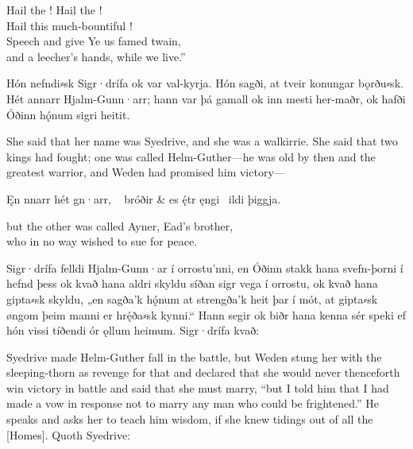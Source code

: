 \bvb Hail the ! Hail the ! \\
\ind Hail this much-bountiful ! \\
Speech and  give Ye us famed twain, \\
\ind and a leecher’s hands, while we live.”\evb\evg


\bpg\bpa[3a] Hón nefndi⸗sk Sigr·drífa ok var val-kyrja. Hón sagði, at tveir konungar bǫrðu⸗sk. Hét annarr Hjalm-Gunn·arr; hann var þá gamall ok inn mesti her-maðr, ok hafði Óðinn hǫ́num sigri heitit.\epa

\bpb She said that her name was Syedrive, and she was a walkirrie.  She said that two kings had fought; one was called Helm-Guther---he was old by then and the greatest warrior, and Weden had promised him victory---\epb\epg

\bvg\bva[4*]%
%
Ęn nnarr hét gn·arr, \hld\  bróðir &
\ind es ę́tr ęngi \hld\ ildi þiggja.\eva

\bvb but the other was called Ayner, Ead’s brother, \\
who in no way wished to sue for peace.\evb\evg

\bpg\bpa[3b] Sigr·drífa felldi Hjalm-Gunn·ar í orrostu’nni, en Óðinn stakk hana svefn-þorni í hefnd þess ok kvað hana aldri skyldu síðan sigr vega í orrostu, ok kvað hana gipta⸗sk skyldu, „en sagða’k hǫ́num at strengða’k heit þar í mót, at gipta⸗sk øngom þeim manni er hrę́ða⸗sk kynni.“ Hann segir ok biðr hana kenna sér speki ef hón vissi tíðendi ór ǫllum heimum. Sigr·drífa kvað:\epa

\bpb Syedrive made Helm-Guther fall in the battle, but Weden stung her with the sleeping-thorn as revenge for that and declared that she would never thenceforth win victory in battle and said that she must marry, “but I told him that I had made a vow in response not to marry any man who could be frightened.”  He  speaks and asks her to teach him wisdom, if she knew tidings out of all the [Homes]. Quoth Syedrive:\epb\epg


